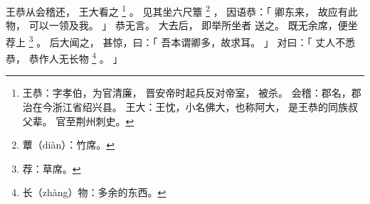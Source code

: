 
\switchcolumn*[\section{}]

王恭从会稽还，
王大看之%
\footnote{%
    王恭：字孝伯，为官清廉，
          晋安帝时起兵反对帝室，
          被杀。
    会稽：郡名，郡治在今浙江省绍兴县。
    王大：王忱，小名佛大，也称阿大，
          是王恭的同族叔父辈。
          官至荆州刺史。
}%
。
见其坐六尺簟%
\footnote{%
    蕈（diàn）：竹席。
}%
，
因语恭：「
    卿东来，
    故应有此物，
    可以一领及我。
」
恭无言。
大去后，
即举所坐者
送之。
既无余席，便坐荐上%
\footnote{%
    荐：草席。
}%
。
后大闻之，
甚惊，曰：「
    吾本谓卿多，故求耳。
」
对曰：「
    丈人不悉恭，
    恭作人无长物%
    \footnote{%
        长（zhàng）物：多余的东西。
    }%
    。
」

\switchcolumn



